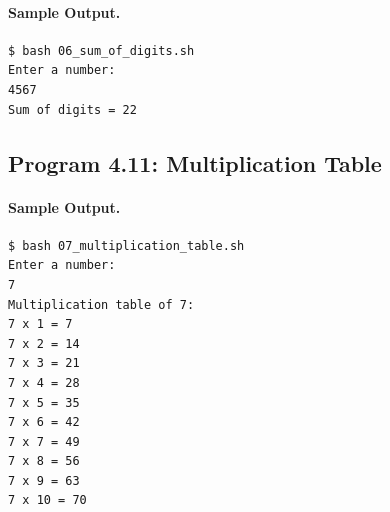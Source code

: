

\paragraph{Sample Output.}
\begin{lstlisting}[style=terminal]
$ bash 06_sum_of_digits.sh
Enter a number:
4567
Sum of digits = 22
\end{lstlisting}


\subsection{Program 4.11: Multiplication Table}





\paragraph{Sample Output.}
\begin{lstlisting}[style=terminal]
$ bash 07_multiplication_table.sh
Enter a number:
7
Multiplication table of 7:
7 x 1 = 7
7 x 2 = 14
7 x 3 = 21
7 x 4 = 28
7 x 5 = 35
7 x 6 = 42
7 x 7 = 49
7 x 8 = 56
7 x 9 = 63
7 x 10 = 70
\end{lstlisting}

